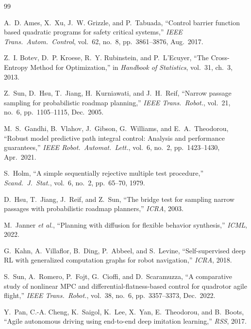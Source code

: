 \documentclass[11pt,onecolumn,a4paper]{article}
\begin{document}

\begin{thebibliography}{99}

A.~D. Ames, X.~Xu, J.~W. Grizzle, and P.~Tabuada, ``Control barrier
function based quadratic programs for safety critical systems,''
\emph{IEEE Trans.\ Autom.\ Control}, vol.~62, no.~8, pp.~3861--3876,
Aug.\ 2017.

Z.~I. Botev, D.~P. Kroese, R.~Y. Rubinstein, and P.~L'Ecuyer, ``The
Cross-Entropy Method for Optimization,'' in \emph{Handbook of
Statistics}, vol.~31, ch.~3, 2013.

Z.~Sun, D.~Hsu, T.~Jiang, H.~Kurniawati, and J.~H.~Reif, ``Narrow
passage sampling for probabilistic roadmap planning,'' \emph{IEEE
Trans.\ Robot.}, vol.~21, no.~6, pp.~1105--1115, Dec.\ 2005.

M.~S.~Gandhi, B.~Vlahov, J.~Gibson, G.~Williams, and
E.~A.~Theodorou, ``Robust model predictive path integral control:
Analysis and performance guarantees,'' \emph{IEEE Robot.\ Automat.\
Lett.}, vol.~6, no.~2, pp.~1423--1430, Apr.\ 2021.

S.~Holm, ``A simple sequentially rejective multiple test procedure,''
\emph{Scand.\ J.\ Stat.}, vol.~6, no.~2, pp.~65--70, 1979.

D.~Hsu, T.~Jiang, J.~Reif, and Z.~Sun, ``The bridge test for sampling
narrow passages with probabilistic roadmap planners,'' \emph{ICRA},
2003.

M.~Janner \emph{et al.}, ``Planning with diffusion for flexible
behavior synthesis,'' \emph{ICML}, 2022.

G.~Kahn, A.~Villaflor, B.~Ding, P.~Abbeel, and S.~Levine,
``Self-supervised deep RL with generalized computation graphs for
robot navigation,'' \emph{ICRA}, 2018.

S.~Sun, A.~Romero, P.~Fojt, G.~Cioffi, and D.~Scaramuzza, ``A
comparative study of nonlinear MPC and differential-flatness-based
control for quadrotor agile flight,'' \emph{IEEE Trans.\ Robot.},
vol.~38, no.~6, pp.~3357--3373, Dec.\ 2022.

Y.~Pan, C.-A. Cheng, K.~Saigol, K.~Lee, X.~Yan, E.~Theodorou, and
B.~Boots, ``Agile autonomous driving using end-to-end deep imitation
learning,'' \emph{RSS}, 2017.


\end{thebibliography}
\end{document}
